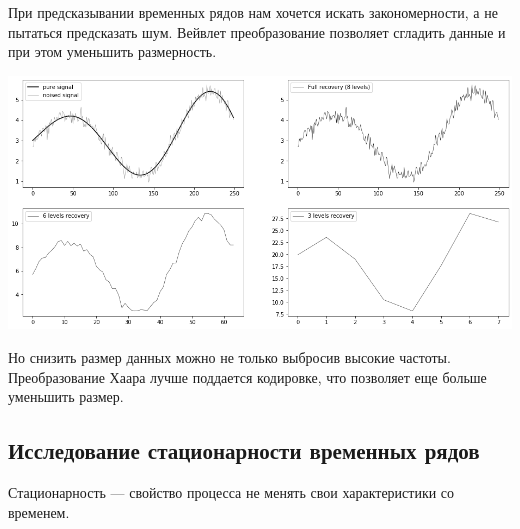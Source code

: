 \documentclass[a4paper]{article}
\begin{document}
	При предсказывании временных рядов нам хочется искать закономерности, а не пытаться предсказать шум. Вейвлет преобразование позволяет сгладить данные и при этом уменьшить размерность.
	
	\begin{center}
		\includegraphics[scale=0.5]{./output_7_0.png}
	\end{center}

	Но снизить размер данных можно не только выбросив высокие частоты. Преобразование Хаара лучше поддается кодировке, что позволяет еще больше уменьшить размер.
	
	\subsection{Исследование стационарности временных рядов}
	
	Стационарность --- свойство процесса не менять свои характеристики со временем.
	
\end{document}
